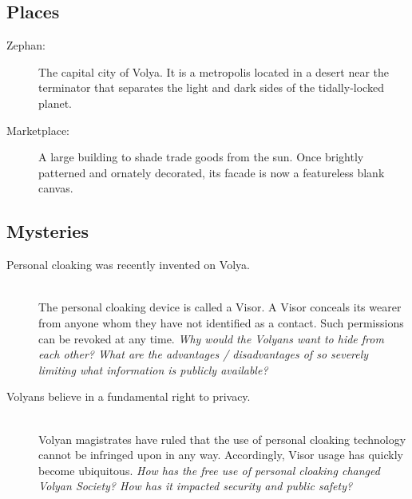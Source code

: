 \documentclass[11pt, a5paper, parskip=half-, DIV=12]{scrartcl}
\begin{document}
\subsection*{Places}
\begin{description}
	\item[Zephan:] The capital city of Volya. It is a metropolis located in a desert near the terminator that separates the light and dark sides of the tidally-locked planet.
	\item[Marketplace:] A large building to shade trade goods from the sun. Once brightly patterned and ornately decorated, its facade is now a featureless blank canvas.
\end{description}

\subsection*{Mysteries}
\begin{description}
	\item[Personal cloaking was recently invented on Volya.] \phantom{} \\ The personal cloaking device is called a Visor. A Visor conceals its wearer from anyone whom they have not identified as a contact. Such permissions can be revoked at any time. \textit{Why would the Volyans want to hide from each other? What are the advantages / disadvantages of so severely limiting what information is publicly available?}
	\item[Volyans believe in a fundamental right to privacy.] \phantom{} \\ Volyan magistrates have ruled that the use of personal cloaking technology cannot be infringed upon in any way. Accordingly, Visor usage has quickly become ubiquitous. \textit{How has the free use of personal cloaking changed Volyan Society? How has it impacted security and public safety?}
\end{description}

\newpage



\newpage

\thispagestyle{empty}
\end{document}
